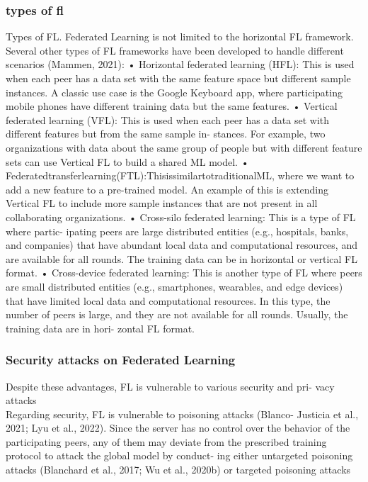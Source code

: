 \subsubsection{types of fl}
Types of FL. Federated Learning is not limited to the horizontal FL framework. Several other types of FL frameworks have been developed to handle different scenarios (Mammen, 2021):
• Horizontal federated learning (HFL): This is used when each peer has a data set with the same feature space but different sample instances. A classic use case is the Google Keyboard app, where participating mobile phones have different training data but the same features.
• Vertical federated learning (VFL): This is used when each peer has a data set with different features but from the same sample in- stances. For example, two organizations with data about the same group of people but with different feature sets can use Vertical FL to build a shared ML model.
• Federatedtransferlearning(FTL):ThisissimilartotraditionalML, where we want to add a new feature to a pre-trained model. An example of this is extending Vertical FL to include more sample instances that are not present in all collaborating organizations.
• Cross-silo federated learning: This is a type of FL where partic- ipating peers are large distributed entities (e.g., hospitals, banks, and companies) that have abundant local data and computational resources, and are available for all rounds. The training data can be in horizontal or vertical FL format.
• Cross-device federated learning: This is another type of FL where peers are small distributed entities (e.g., smartphones, wearables, and edge devices) that have limited local data and computational resources. In this type, the number of peers is large, and they are not available for all rounds. Usually, the training data are in hori- zontal FL format.
\subsubsection{Security attacks on Federated Learning}

Despite these advantages, FL is vulnerable to various security and pri- vacy attacks \\
Regarding security, FL is vulnerable to poisoning attacks 
(Blanco- Justicia et al., 2021; Lyu et al., 2022). Since the server has no control
 over the behavior of the participating peers, any of them may deviate from the prescribed 
 training protocol to attack the global model by conduct- ing either untargeted poisoning 
 attacks (Blanchard et al., 2017; Wu et al., 2020b) or targeted poisoning attacks \\

